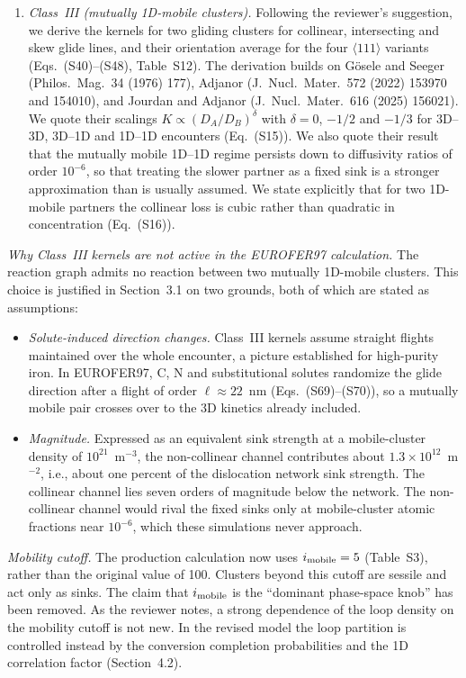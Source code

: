 \documentclass{article}
\newcommand{\hkl}[1]{\langle #1\rangle}
\newcommand{\imob}{i_{\rm mobile}}
\begin{document}
\begin{itemize}
\begin{enumerate}[label=(\alph*)]
\item \emph{Class~III (mutually 1D-mobile clusters).} Following the reviewer's suggestion, we derive the kernels for two gliding clusters for collinear, intersecting and skew glide lines, and their orientation average for the four $\hkl{111}$ variants (Eqs.~(S40)--(S48), Table~S12). The derivation builds on Gösele and Seeger (Philos.\ Mag.\ 34 (1976) 177), Adjanor (J.\ Nucl.\ Mater.\ 572 (2022) 153970 and 154010), and Jourdan and Adjanor (J.\ Nucl.\ Mater.\ 616 (2025) 156021). We quote their scalings $K\propto(D_A/D_B)^{\delta}$ with $\delta = 0$, $-1/2$ and $-1/3$ for 3D--3D, 3D--1D and 1D--1D encounters (Eq.~(S15)). We also quote their result that the mutually mobile 1D--1D regime persists down to diffusivity ratios of order $10^{-6}$, so that treating the slower partner as a fixed sink is a stronger approximation than is usually assumed. We state explicitly that for two 1D-mobile partners the collinear loss is cubic rather than quadratic in concentration (Eq.~(S16)).
\end{enumerate}

\emph{Why Class~III kernels are not active in the EUROFER97 calculation.} The reaction graph admits no reaction between two mutually 1D-mobile clusters. This choice is justified in Section~3.1 on two grounds, both of which are stated as assumptions:
\begin{itemize}
    \item \emph{Solute-induced direction changes.} Class~III kernels assume straight flights maintained over the whole encounter, a picture established for high-purity iron. In EUROFER97, C, N and substitutional solutes randomize the glide direction after a flight of order $\ell\approx22$~nm (Eqs.~(S69)--(S70)), so a mutually mobile pair crosses over to the 3D kinetics already included.
    \item \emph{Magnitude.} Expressed as an equivalent sink strength at a mobile-cluster density of $10^{21}$~m$^{-3}$, the non-collinear channel contributes about $1.3\times10^{12}$~m$^{-2}$, i.e., about one percent of the dislocation network sink strength. The collinear channel lies seven orders of magnitude below the network. The non-collinear channel would rival the fixed sinks only at mobile-cluster atomic fractions near $10^{-6}$, which these simulations never approach.
\end{itemize}

\emph{Mobility cutoff.} The production calculation now uses $\imob=5$ (Table~S3), rather than the original value of 100. Clusters beyond this cutoff are sessile and act only as sinks. The claim that $\imob$ is the ``dominant phase-space knob'' has been removed. As the reviewer notes, a strong dependence of the loop density on the mobility cutoff is not new. In the revised model the loop partition is controlled instead by the conversion completion probabilities and the 1D correlation factor (Section~4.2).


\end{itemize}
\end{document}
